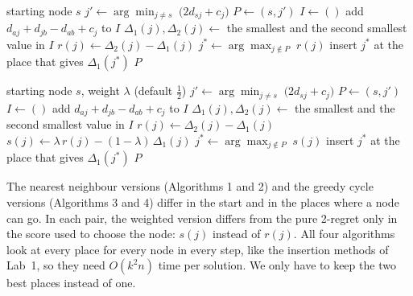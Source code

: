 \documentclass[11pt,a4paper]{article}
\begin{document}
\begin{algorithm}[H]
\caption{Greedy cycle with greedy 2-regret}
\begin{algorithmic}[1]
\Require starting node $s$
\State $j' \gets \arg\min_{j \neq s} \; \bigl(2 d_{sj} + c_j\bigr)$ 
\State $P \gets (s, j')$ 
    \State $I \gets ()$
     
      \State add $d_{aj} + d_{jb} - d_{ab} + c_j$ to $I$
    \EndFor
    \State $\Delta_1(j), \Delta_2(j) \gets$ the smallest and the second smallest value in $I$
    \State $r(j) \gets \Delta_2(j) - \Delta_1(j)$ 
  \EndFor
  \State $j^\ast \gets \arg\max_{j \notin P} \; r(j)$
  \State insert $j^\ast$ at the place that gives $\Delta_1(j^\ast)$
\EndWhile
\State \Return $P$
\end{algorithmic}
\end{algorithm}

\begin{algorithm}[H]
\caption{Greedy cycle with greedy 2-regret + best change of the objective}
\begin{algorithmic}[1]
\Require starting node $s$, weight $\lambda$ (default $\tfrac12$)
\State $j' \gets \arg\min_{j \neq s} \; \bigl(2 d_{sj} + c_j\bigr)$ 
\State $P \gets (s, j')$ 
    \State $I \gets ()$
     
      \State add $d_{aj} + d_{jb} - d_{ab} + c_j$ to $I$
    \EndFor
    \State $\Delta_1(j), \Delta_2(j) \gets$ the smallest and the second smallest value in $I$
    \State $r(j) \gets \Delta_2(j) - \Delta_1(j)$ 
    \State $s(j) \gets \lambda\, r(j) - (1 - \lambda)\, \Delta_1(j)$ 
  \EndFor
  \State $j^\ast \gets \arg\max_{j \notin P} \; s(j)$
  \State insert $j^\ast$ at the place that gives $\Delta_1(j^\ast)$
\EndWhile
\State \Return $P$
\end{algorithmic}
\end{algorithm}

The nearest neighbour versions (Algorithms 1 and 2) and the greedy cycle
versions (Algorithms 3 and 4) differ in the start and in the places where a
node can go. In each pair, the weighted version differs from the pure 2-regret
only in the score used to choose the node: $s(j)$ instead of $r(j)$. All four
algorithms look at every place for every node in every step, like the
insertion methods of Lab~1, so they need $O(k^2 n)$ time per solution. We only
have to keep the two best places instead of one.
\end{document}
